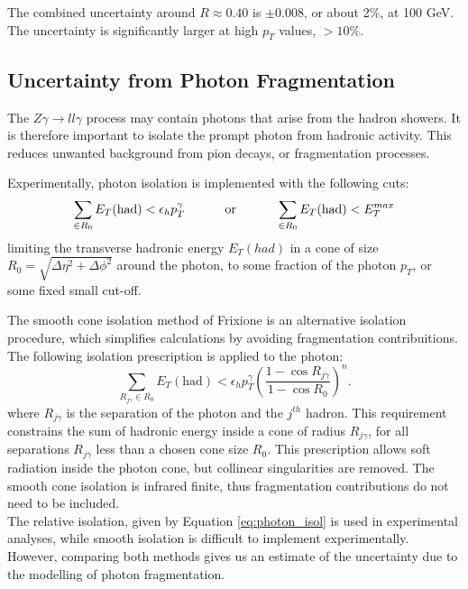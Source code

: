 \documentclass[11pt,a4paper,openright,twoside]{report}
\newcommand{\Zg}{$Z\gamma\to ll\gamma$ }
\begin{document}
\noindent The combined uncertainty around $R \approx 0.40$ is $\pm 0.008$, or about 2\%, at 100 GeV. The uncertainty is significantly larger at high $p_T$ values, $>10\%$.

\subsection{Uncertainty from Photon Fragmentation}
The \Zg process may contain photons that arise from the hadron showers. It is therefore important to isolate the prompt photon from hadronic activity. This reduces unwanted background from pion decays, or fragmentation processes.

Experimentally, photon isolation is implemented with the following cuts:
\begin{equation}
\sum_{\in R_0} E_T(\text{had}) < \epsilon_h p_T^\gamma \text{\hspace{1cm} or \hspace{1cm}} \sum_{\in R_0} E_T(\text{had}) < E_T^{max}
\end{equation}
\label{eq:photon_isol}
limiting the transverse hadronic energy $E_T(had)$ in a cone of size $R_0 = \sqrt{\Delta\eta^2 + \Delta\phi^2}$ around the photon, to some fraction of the photon $p_T$, or some fixed small cut-off.

The smooth cone isolation method of Frixione \cite{frixione} is an alternative isolation procedure, which simplifies calculations by avoiding fragmentation contribuitions. The following isolation prescription is applied to the photon:
\begin{equation}
	\sum_{R_{j\gamma} \in R_0} E_T(\text{had}) < \epsilon_h p_T^\gamma \left(\frac{1-\cos R_{j\gamma}}{1-\cos R_0}\right)^n.
\end{equation}
\label{eq:frix_isol}
where $R_{j\gamma}$ is the separation of the photon and the $j^{th}$ hadron. This requirement constrains the sum of hadronic energy inside a cone of radius $R_{j\gamma}$, for all separations $R_{j\gamma}$ less than a chosen cone size $R_0$. This prescription allows soft radiation inside the photon cone, but collinear singularities are removed. The smooth cone isolation is infrared finite, thus fragmentation contributions do not need to be included.\\
The relative isolation, given by Equation \ref{eq:photon_isol} is used in experimental analyses, while smooth isolation is difficult to implement experimentally. However, comparing both methods gives us an estimate of the uncertainty due to the modelling of photon fragmentation.
\end{document}
